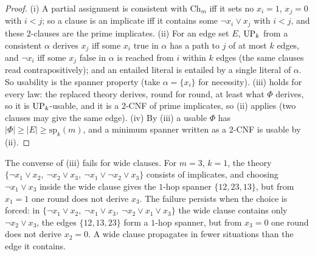 \begin{proof}
(i) A partial assignment is consistent with $\mathrm{Ch}_m$ iff it sets no $x_i=1$, $x_j=0$ with $i<j$; so a clause is an implicate iff it contains some $\neg x_i\vee x_j$ with $i<j$, and these $2$-clauses are the prime implicates. (ii) For an edge set $E$, $\mathrm{UP}_k$ from a consistent $\alpha$ derives $x_j$ iff some $x_i$ true in $\alpha$ has a path to $j$ of at most $k$ edges, and $\neg x_i$ iff some $x_j$ false in $\alpha$ is reached from $i$ within $k$ edges (the same clauses read contrapositively); and an entailed literal is entailed by a single literal of $\alpha$. So usability is the spanner property (take $\alpha=\{x_i\}$ for necessity). (iii)  holds for every law: the replaced theory derives, round for round, at least what $\Phi$ derives, so it is $\mathrm{UP}_k$-usable, and it is a $2$-CNF of prime implicates, so (ii) applies (two clauses may give the same edge). (iv) By (iii) a usable $\Phi$ has $\lvert\Phi\rvert\ge\lvert E\rvert\ge\mathrm{sp}_k(m)$, and a minimum spanner written as a $2$-CNF is usable by (ii).
\end{proof}

The converse of (iii) fails for wide clauses. For $m=3$, $k=1$, the theory $\{\neg x_1\vee x_2,\ \neg x_2\vee x_3,\ \neg x_1\vee\neg x_2\vee x_3\}$ consists of implicates, and choosing $\neg x_1\vee x_3$ inside the wide clause gives the $1$-hop spanner $\{12,23,13\}$, but from $x_1=1$ one round does not derive $x_3$. The failure persists when the choice is forced: in $\{\neg x_1\vee x_2,\ \neg x_1\vee x_3,\ \neg x_2\vee x_1\vee x_3\}$ the wide clause contains only $\neg x_2\vee x_3$, the edges $\{12,13,23\}$ form a $1$-hop spanner, but from $x_3=0$ one round does not derive $x_2=0$. A wide clause propagates in fewer situations than the edge it contains.

